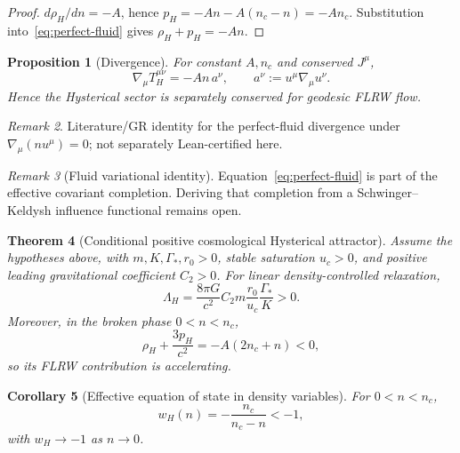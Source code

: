 \documentclass[11pt]{article}
\newtheorem{theorem}{Theorem}[section]
\newtheorem{corollary}[theorem]{Corollary}
\newtheorem{proposition}[theorem]{Proposition}
\theoremstyle{definition}
\theoremstyle{remark}
\newtheorem{remark}[theorem]{Remark}
\begin{document}
\begin{proof}
$d\rho_H/dn=-A$, hence $p_H=-An-A(n_c-n)=-An_c$.
Substitution into~\eqref{eq:perfect-fluid} gives $\rho_H+p_H=-An$.
\end{proof}

\begin{proposition}[Divergence]
\label{prop:divergence}
For constant $A,n_c$ and conserved $J^\mu$,
\begin{equation}
\boxed{\nabla_\mu T_H^{\mu\nu}=-A n\,a^\nu,\qquad a^\nu:=u^\mu\nabla_\mu u^\nu.}
\end{equation}
Hence the Hysterical sector is separately conserved for geodesic FLRW flow.
\end{proposition}
\begin{remark}
\label{rem:divergence}
Literature/GR identity for the perfect-fluid divergence under $\nabla_\mu(nu^\mu)=0$; not separately Lean-certified here.
\end{remark}

\begin{remark}[Fluid variational identity]
\label{rem:fluid}
Equation~\eqref{eq:perfect-fluid} is part of the effective covariant completion.
Deriving that completion from a Schwinger--Keldysh influence functional remains open.
\end{remark}

\begin{theorem}[Conditional positive cosmological Hysterical attractor]
\label{thm:Lambda}
Assume the hypotheses above, with $m,K,\Gamma_*,r_0>0$, stable saturation $u_c>0$, and positive leading gravitational coefficient $C_2>0$.
For linear density-controlled relaxation,
\begin{equation}
\boxed{\Lambda_H=\frac{8\pi G}{c^2}C_2 m\frac{r_0}{u_c}\frac{\Gamma_*}{K}>0.}
\end{equation}
Moreover, in the broken phase $0<n<n_c$,
\begin{equation}
\boxed{\rho_H+\frac{3p_H}{c^2}=-A(2n_c+n)<0,}
\end{equation}
so its FLRW contribution is accelerating.
\end{theorem}

\begin{corollary}[Effective equation of state in density variables]
\label{cor:w-n}
For $0<n<n_c$,
\begin{equation}
\boxed{w_H(n)=-\frac{n_c}{n_c-n}<-1,}
\end{equation}
with $w_H\to-1$ as $n\to0$.
\end{corollary}
\end{document}
